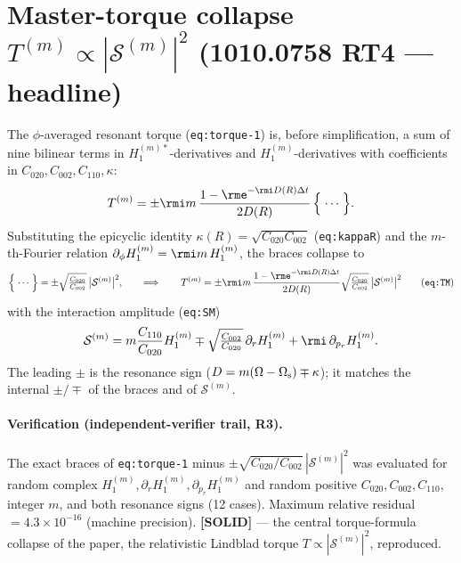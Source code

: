 \documentclass{article}
\begin{document}
\section*{Master-torque collapse $T^{(m)}\propto|\mathcal{S}^{(m)}|^2$ (1010.0758 RT4 — headline)}

The $\phi$-averaged resonant torque (\texttt{eq:torque-1}) is, before simplification, a sum of nine bilinear
terms in $H_1^{(m)\ast}$-derivatives and $H_1^{(m)}$-derivatives with coefficients in
$C_{020},C_{002},C_{110},\kappa$:
\begin{equation}
  T^{(m)} = \pm\rmi m\,\frac{1-\rme^{-\rmi D(R)\Delta t}}{2D(R)}\,\Bigl\{\;\cdots\;\Bigr\}.
\end{equation}
Substituting the epicyclic identity $\kappa(R)=\sqrt{C_{020}C_{002}}$ (\texttt{eq:kappaR}) and the
$m$-th-Fourier relation $\partial_\phi H_1^{(m)}=\rmi m\,H_1^{(m)}$, the braces collapse to
\begin{equation}
  \Bigl\{\;\cdots\;\Bigr\} = \pm\sqrt{\tfrac{C_{020}}{C_{002}}}\,\bigl|\mathcal{S}^{(m)}\bigr|^2,
  \qquad\Longrightarrow\qquad
  T^{(m)} = \pm\rmi m\,\frac{1-\rme^{-\rmi D(R)\Delta t}}{2D(R)}\sqrt{\tfrac{C_{020}}{C_{002}}}\,
  \bigl|\mathcal{S}^{(m)}\bigr|^2
  \tag{\texttt{eq:TM}}
\end{equation}
with the interaction amplitude (\texttt{eq:SM})
\begin{equation}
  \mathcal{S}^{(m)} = m\frac{C_{110}}{C_{020}}H_1^{(m)}
    \mp\sqrt{\tfrac{C_{002}}{C_{020}}}\,\partial_r H_1^{(m)}
    + \rmi\,\partial_{p_r}H_1^{(m)} .
\end{equation}
The leading $\pm$ is the resonance sign ($D=m(\Omega-\Omega_{\rm s})\mp\kappa$); it matches the internal
$\pm/\mp$ of the braces and of $\mathcal{S}^{(m)}$.

\paragraph{Verification (independent-verifier trail, R3).} The exact braces of \texttt{eq:torque-1} minus
$\pm\sqrt{C_{020}/C_{002}}\,|\mathcal{S}^{(m)}|^2$ was evaluated for random complex
$H_1^{(m)},\partial_r H_1^{(m)},\partial_{p_r}H_1^{(m)}$ and random positive $C_{020},C_{002},C_{110}$,
integer $m$, and both resonance signs (12 cases). Maximum relative residual $=4.3\times10^{-16}$ (machine
precision). \textbf{[SOLID]} — the central torque-formula collapse of the paper, the relativistic Lindblad
torque $T\propto|\mathcal{S}^{(m)}|^2$, reproduced.
\end{document}

